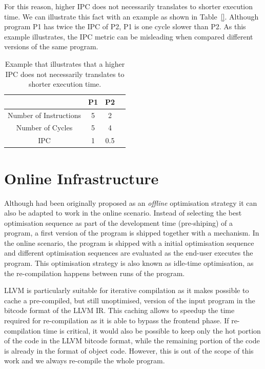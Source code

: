 For this reason, higher IPC does not necessarily translates to shorter execution time.
We can illustrate this fact with an example as shown in Table~\ref{}.
Although program P1 has twice the IPC of P2, P1 is one cycle slower than P2.
As this example illustrates, the IPC metric can be misleading when compared different versions of the same program.

\begin{table}[h]
\centering
\begin{tabular}{|c|c|c|c|}
\hline
                       & P1 & P2  \\
\hline
Number of Instructions & 5  & 2   \\
Number of Cycles       & 5  & 4   \\
IPC                    & 1  & 0.5 \\
\hline
\end{tabular}
\caption{Example that illustrates that a higher IPC does not necessarily translates to shorter execution time.}
\label{tab:ipc-example}
\end{table}

\section{Online {\IterComp} Infrastructure} \label{sec:oic-infra}

Although {\itercomp} had been originally proposed as an \textit{offline} optimisation strategy it can also be adapted to work in the online scenario.
Instead of selecting the best optimisation sequence as part of the development time (pre-shiping) of a program, a first version of the program is shipped together with a {\itercomp} mechanism.
In the online scenario, the program is shipped with a initial optimisation sequence and different optimisation sequences are evaluated as the end-user executes the program.
This optimisation strategy is also known as idle-time optimisation, as the re-compilation happens between runs of the program.

LLVM is particularly suitable for iterative compilation as it makes possible to cache a pre-compiled, but still unoptimised, version of the input program in the bitcode format of the LLVM IR.  
This caching allows to speedup the time required for re-compilation as it is able to bypass the frontend phase.
If re-compilation time is critical, it would also be possible to keep only the hot portion of the code in the LLVM bitcode format, while the remaining portion of the code is already in the format of object code.
However, this is out of the scope of this work and we always re-compile the whole program.

